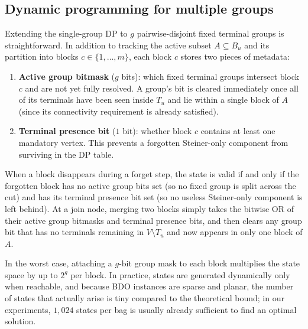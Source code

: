 \documentclass[11pt]{article}
\theoremstyle{definition}
\theoremstyle{remark}
\begin{document}
\subsection{Dynamic programming for multiple groups}
\label{sec:multi_group}
Extending the single-group DP to $g$ pairwise-disjoint fixed terminal groups is straightforward. In addition to tracking the active subset $A \subseteq B_u$ and its partition into blocks $c \in \{1, \dots, m\}$, each block $c$ stores two pieces of metadata:
\begin{enumerate}
    \item[$\bullet$] \textbf{Active group bitmask} ($g$ bits): which fixed terminal groups intersect block $c$ and are not yet fully resolved. A group's bit is cleared immediately once all of its terminals have been seen inside $T_u$ and lie within a single block of $A$ (since its connectivity requirement is already satisfied).
    \item[$\bullet$] \textbf{Terminal presence bit} ($1$ bit): whether block $c$ contains at least one mandatory vertex. This prevents a forgotten Steiner-only component from surviving in the DP table.
\end{enumerate}

When a block disappears during a forget step, the state is valid if and only if the forgotten block has no active group bits set (so no fixed group is split across the cut) and has its terminal presence bit set (so no useless Steiner-only component is left behind). At a join node, merging two blocks simply takes the bitwise OR of their active group bitmasks and terminal presence bits, and then clears any group bit that has no terminals remaining in $V \setminus T_u$ and now appears in only one block of $A$.

In the worst case, attaching a $g$-bit group mask to each block multiplies the state space by up to $2^g$ per block. In practice, states are generated dynamically only when reachable, and because BDO instances are sparse and planar, the number of states that actually arise is tiny compared to the theoretical bound; in our experiments, $1{,}024$ states per bag is usually already sufficient to find an optimal solution.
\end{document}
